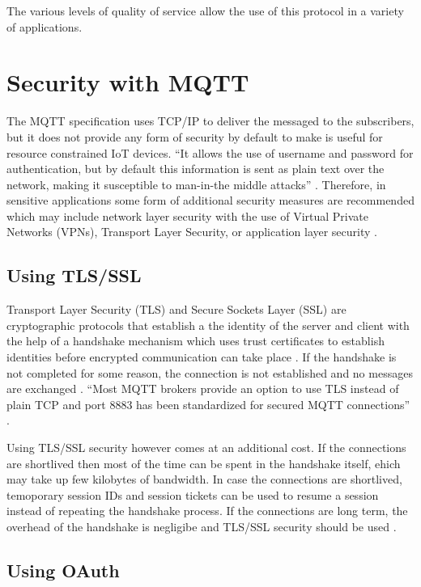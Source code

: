 \documentclass[sigconf]{acmart}
\begin{document}
The various levels of quality of service allow the use of this
protocol in a variety of applications.

\section{Security with MQTT}

The MQTT specification uses TCP/IP to deliver the messaged to the
subscribers, but it does not provide any form of security by default
to make is useful for resource constrained IoT devices. ``It allows
the use of username and password for authentication, but by default
this information is sent as plain text over the network, making it
susceptible to man-in-the middle attacks''
\cite{iot-design-mqtt-security} \cite{mqtt-sec-ssl}. Therefore, in
sensitive applications some form of additional security measures are
recommended which may include network layer security with the use of
Virtual Private Networks (VPNs), Transport Layer Security, or
application layer security \cite{mqtt-sec-ssl}.

\subsection{Using TLS/SSL}

Transport Layer Security (TLS) and Secure Sockets Layer (SSL) are
cryptographic protocols that establish a the identity of the server
and client with the help of a handshake mechanism which uses trust
certificates to establish identities before encrypted communication
can take place \cite{ibm-mqtt-security}. If the handshake is not
completed for some reason, the connection is not established and no
messages are exchanged \cite{mqtt-sec-ssl}. ``Most MQTT brokers
provide an option to use TLS instead of plain TCP and port 8883 has
been standardized for secured MQTT connections''
\cite{iot-design-mqtt-security}.

Using TLS/SSL security however comes at an additional cost. If the
connections are shortlived then most of the time can be spent in the
handshake itself, ehich may take up few kilobytes of bandwidth. In
case the connections are shortlived, temoporary session IDs and
session tickets can be used to resume a session instead of repeating
the handshake process. If the connections are long term, the overhead
of the handshake is negligibe and TLS/SSL security should be used
\cite{iot-design-mqtt-security}\cite{mqtt-sec-ssl}.

\subsection{Using OAuth}
\end{document}
